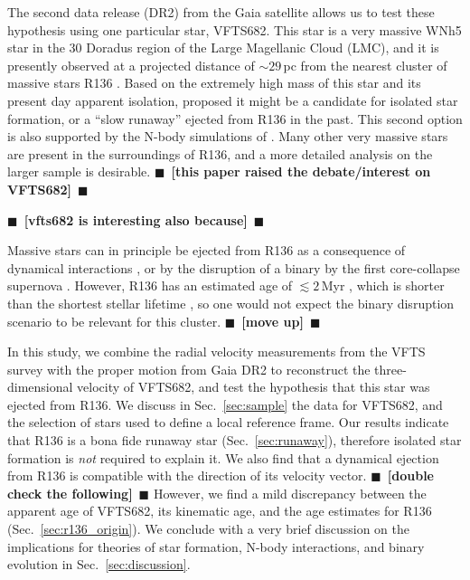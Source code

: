 \documentclass{aa}
\newcommand{\todo}[1]{{\large $\blacksquare$~\textbf{\color{red}[#1]}}~$\blacksquare$}
\DeclareRobustCommand{\Secref}[1]{Sec.~\ref{#1}}
\begin{document}
The second data release (DR2) from the Gaia satellite
\cite[][]{gaia:16,brown:18} allows us to test
these hypothesis using one particular star, VFTS682. 
This star is a
very massive \citep[$M_\mathrm{ZAMS}\simeq150\,M_\odot$,][]{bestenlehner:11,schneider:18} WNh5 star in the 30 Doradus region
of the Large Magellanic Cloud (LMC), and it is presently observed at a
projected distance of $\sim$$29$\,pc from the nearest cluster of
massive stars R136 \citep[][]{bestenlehner:11}. Based on the extremely high mass of this star and
its present day apparent isolation, \cite{bestenlehner:11} proposed it
might be a candidate for isolated star formation, or a ``slow runaway'' ejected
from R136 in the past. This second option is also supported by the
N-body simulations of \cite{fujii:11, banerjee:12}.   Many other
very massive stars are present in the surroundings of R136, and a more
detailed analysis on the larger sample is desirable.
\todo{this paper raised the debate/interest on VFTS682}

\todo{vfts682 is interesting also because}

Massive stars can in principle be ejected from R136 as a consequence of dynamical
interactions \citep[][]{poveda:67,leonard:91, evans:10, fujii:11,
  allison:12, oh:16}, or by the disruption of a binary by the first
core-collapse supernova
\citep[][]{zwicky:57,blaauw:61,dedonder:97,eldridge:11,renzo:18}. However,
R136 has an estimated age of $\lesssim2$\,Myr \citep[][]{sabbi:12}, which is
shorter than the shortest stellar lifetime
\citep[$\sim$3\,Myr, e.g.,][]{zapartas:17}, so one would not expect the binary
disruption scenario to be relevant for this cluster. \todo{move up}


In this study, we combine the radial velocity measurements from the
VFTS survey \citep[][]{evans:11} with the proper motion from Gaia DR2
to reconstruct the three-dimensional velocity of VFTS682, and test the
hypothesis that this star was ejected from R136. We discuss in
\Secref{sec:sample} the data for VFTS682, and the selection of stars
used to define a local reference frame. Our results
indicate that R136 is a bona fide runaway star (\Secref{sec:runaway}), therefore isolated star formation is \emph{not}
required to explain it. We also find that a dynamical ejection from
R136 is compatible with the direction of its velocity
vector. \todo{double check the following}
However, we find a mild discrepancy between the apparent age of
VFTS682, its kinematic age, and the age estimates for R136 (\Secref{sec:r136_origin}).  We conclude
with a very brief discussion on the implications for theories of
star formation, N-body interactions, and binary evolution in
\Secref{sec:discussion}.
\end{document}
